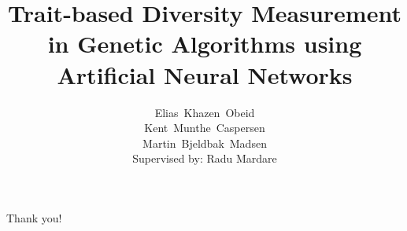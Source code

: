 \documentclass[xcolor=pdftex]{beamer}
\title{Trait-based Diversity Measurement in Genetic Algorithms using Artificial Neural Networks}
\author{%
  Elias~Khazen~Obeid\\
  Kent~Munthe~Caspersen\\
  Martin~Bjeldbak~Madsen\\
  {\small Supervised by: Radu Mardare}
}
\institute{%
  Department of Computer Science\\
  Aalborg University
}
\date{\formatdate{23}{6}{2014}}
\begin{document}
{%
\frame{\titlepage}
}

%
%


\begin{frame}[plain,c]
  \begin{center}
    \Huge Thank you!
  \end{center}
\end{frame}
\end{document}
